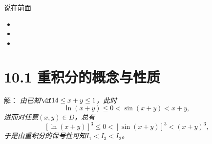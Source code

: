 
\titlepage

\begin{frame}{说在前面}
	\linespread{1.5}
	  \begin{itemize}[<+-|alert@+>]
	    \item {}
	    \item {}
	    \item {}
	  \end{itemize}
\end{frame}


\section{10.1 重积分的概念与性质}

\begin{frame}
	\linespread{1.5}
	
	\bigskip
	
	\small 解：\it
	由已知$\df14\leq x+y\leq 1$，此时
	$$\ln(x+y)\leq 0<\sin(x+y)<x+y,$$
	进而对任意$(x,y)\in D$，总有
	$$[\ln(x+y)]^3\leq 0<[\sin(x+y)]^3<(x+y)^3,$$
	于是由重积分的保号性可知$I_1<I_3<I_2$。\fin
\end{frame}

